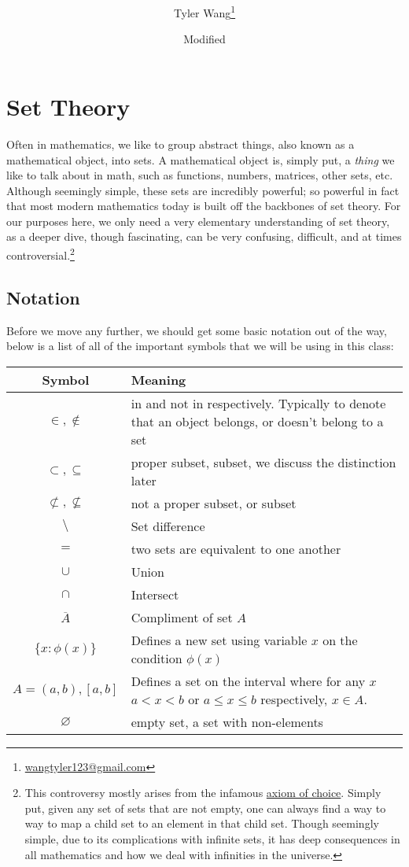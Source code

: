 \documentclass[11pt]{article}
\title{\mytitle \\ [2ex] \Large \mysubtitle}
\date{\small Modified \mydate}
\author {Tyler Wang\thanks{
\href{mailto:wangtyler123@gmail.com}{wangtyler123@gmail.com}}}
\numberwithin{lemma}{section}
\numberwithin{equation}{section}
\numberwithin{define}{section}
\numberwithin{prop}{section}
\numberwithin{figure}{section}
\numberwithin{theorem}{section}
\newcounter{ex}[section]
\numberwithin{ex}{section}
\begin{document}
\maketitle
\thispagestyle{plain}
\section{Set Theory}
Often in mathematics, we like to group abstract things, also known as a mathematical object, into sets. A mathematical object is, simply put, a \textit{thing} we like to talk about in math, such as functions, numbers, matrices, other sets, etc.
Although seemingly simple, these sets are incredibly powerful; so powerful in fact that most modern mathematics today is built off the backbones of set theory. 
For our purposes here, we only need a very elementary understanding of set theory, as a deeper dive, though fascinating, can be very confusing, difficult, and at times controversial.\footnote{This controversy mostly arises from the infamous \href{https://en.wikipedia.org/wiki/Axiom_of_choice}{axiom of choice}. 
Simply put, given any set of sets that are not empty, one can always find a way to way to map a child set to an element in that child set. Though seemingly simple, due to its complications with infinite sets, it has deep consequences in all mathematics and how we deal with infinities in the universe.}
\subsection{Notation}
Before we move any further, we should get some basic notation out of the way, below is a list of all of the important symbols that we will be using in this class:
\begin{center}
	\begin{longtable}{| c | m{8cm} |}
		\hline 
		Symbol & Meaning \\
		\hline 
		$\in,\notin$   & in and not in respectively. Typically to denote that an object belongs, or doesn't belong to a set \\
		\hline 
		$\subset, \subseteq$ & proper subset, subset, we discuss the distinction later \\
		\hline
		$\not\subset, \not\subseteq$ & not a proper subset, or subset \\
		\hline
		$\setminus$ & Set difference \\
		\hline
		$=$ & two sets are equivalent to one another \\
		\hline 
		$\cup$ & Union \\
		\hline
		$\cap$ & Intersect \\
		\hline

		$\overline{A}$ & Compliment of set $A$ \\
		\hline
		$\{x : \phi(x)\}$ & Defines a new set using variable $x$ on the condition $\phi(x)$\\
		\hline
		$A=(a,b),[a,b]$ & Defines a set on the interval where for any $x$ $a < x < b$ or $a\le x \le b$ respectively, $x\in A$. \\
		\hline
		$\varnothing$ & empty set, a set with non-elements \\
		\hline
	\end{longtable}
\end{center}
\end{document}
